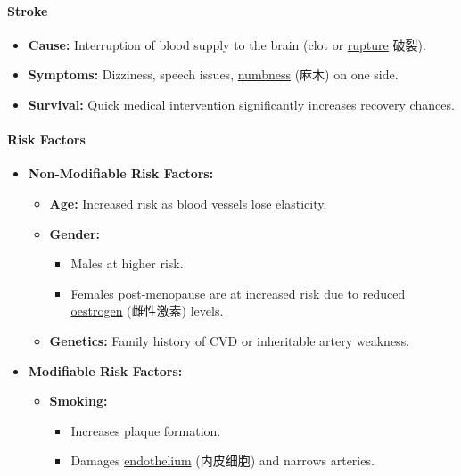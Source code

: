 \paragraph{Stroke}
\begin{itemize}
    \item \textbf{Cause:} Interruption of blood supply to the brain (clot or \underline{rupture} 破裂).
    \item \textbf{Symptoms:} Dizziness, speech issues, \underline{numbness} (麻木) on one side.
    \item \textbf{Survival:} Quick medical intervention significantly increases recovery chances.
\end{itemize}

\paragraph{Risk Factors}
\begin{itemize}
    \item \textbf{Non-Modifiable Risk Factors:}
    \begin{itemize}
        \item \textbf{Age:} Increased risk as blood vessels lose elasticity.
        \item \textbf{Gender:}
        \begin{itemize}
            \item Males at higher risk.
            \item Females post-menopause are at increased risk due to reduced \underline{oestrogen} (雌性激素) levels.
        \end{itemize}
        \item \textbf{Genetics:} Family history of CVD or inheritable artery weakness.
    \end{itemize}
    \item \textbf{Modifiable Risk Factors:}
    \begin{itemize}
        \item \textbf{Smoking:}
        \begin{itemize}
            \item Increases plaque formation.
            \item Damages \underline{endothelium} (内皮细胞) and narrows arteries.
        \end{itemize}
    \end{itemize}
\end{itemize}